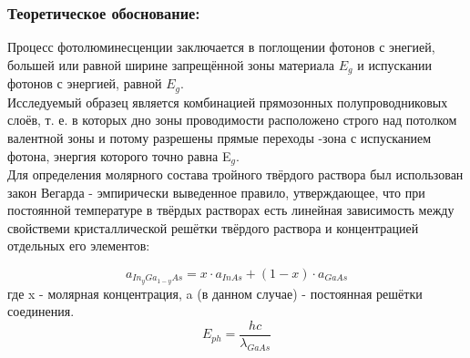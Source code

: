 \documentclass[../FinalReport.tex]{subfiles}
\begin{document}
\subsubsection{Теоретическое обоснование:} Процесс фотолюминесценции заключается в поглощении фотонов с энегией, большей или равной ширине запрещённой зоны материала $E_g$ и испускании фотонов с энергией, равной $E_g$. \\
Исследуемый образец является комбинацией прямозонных полупроводниковых слоёв, т. е. в которых дно зоны проводимости расположено строго над потолком валентной зоны и потому разрешены прямые переходы -зона\rk\- с испусканием фотона, энергия которого точно равна E$_g$.\\
Для определения молярного состава тройного твёрдого раствора был использован закон Вегарда - эмпирически выведенное правило, утверждающее, что при постоянной температуре в твёрдых растворах есть линейная зависимость между свойствеми кристаллической решётки твёрдого раствора и концентрацией отдельных его элементов:

\begin{equation}
\label{vegard}
a_{In_{y}Ga_{1-y}As}=x\cdot a_{InAs} + (1-x)\cdot a_{GaAs}
\end{equation}
где x - молярная концентрация, a (в данном случае)  - постоянная решётки соединения.
\begin{equation}
E_{ph}=\frac{hc}{\lambda_{GaAs}}
\end{equation}
\color{red}
\color{black}
\end{document}
